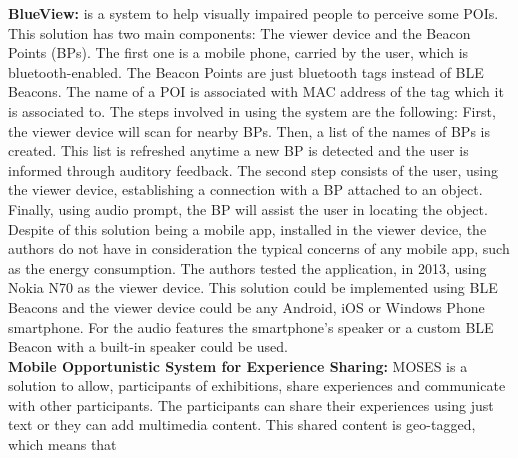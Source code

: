 \textbf{BlueView:}\cite{Chen2013} is a system to help
visually impaired people to perceive some POIs.
This solution has two main components: The viewer device
and the Beacon Points (BPs). The first one is a mobile phone,
carried by the user, which is bluetooth-enabled.
The Beacon Points are just bluetooth tags instead of
BLE Beacons. The name of a POI is associated with
MAC address of the tag which it is associated to.
The steps involved in using the system are the
following: First, the viewer device will scan
for nearby BPs. Then, a list of the names of
BPs is created. This list is refreshed anytime a new
BP is detected and the user is informed through auditory
feedback. The second step consists of the user, using
the viewer device, establishing a connection with a BP
attached to an object. Finally, using audio prompt, the BP
will assist the user in locating the object.
Despite of this solution being a mobile app, installed
in the viewer device, the authors do not have in
consideration the typical concerns of any mobile app,
such as the energy consumption.
The authors tested the application, in 2013,
using Nokia N70 as the viewer device.
This solution could be implemented using BLE Beacons
and the viewer device could be any Android, iOS or
Windows Phone smartphone.
For the audio features the smartphone's speaker or
a custom BLE Beacon with a built-in speaker could be
used.
\\
\textbf{Mobile Opportunistic System for Experience Sharing:}
MOSES\cite{BenAbdesslem2014} is a solution to allow, 
participants of exhibitions, share experiences and
communicate with other participants.
The participants can share their experiences using
just text or they can add multimedia content.
This shared content is geo-tagged, which means that
